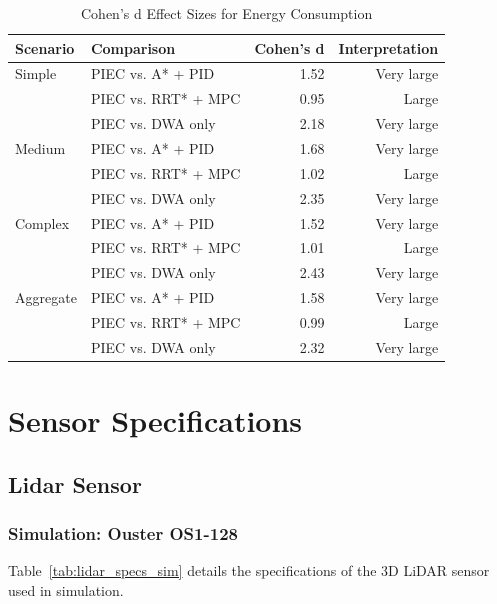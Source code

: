\begin{table}[htbp]
\centering
\caption{Cohen's d Effect Sizes for Energy Consumption}
\label{tab:effect_sizes}
\begin{tabular}{@{}llrr@{}}
\toprule
\textbf{Scenario} & \textbf{Comparison} & \textbf{Cohen's d} & \textbf{Interpretation} \\
\midrule
Simple & PIEC vs. A* + PID & 1.52 & Very large \\
& PIEC vs. RRT* + MPC & 0.95 & Large \\
& PIEC vs. DWA only & 2.18 & Very large \\
\midrule
Medium & PIEC vs. A* + PID & 1.68 & Very large \\
& PIEC vs. RRT* + MPC & 1.02 & Large \\
& PIEC vs. DWA only & 2.35 & Very large \\
\midrule
Complex & PIEC vs. A* + PID & 1.52 & Very large \\
& PIEC vs. RRT* + MPC & 1.01 & Large \\
& PIEC vs. DWA only & 2.43 & Very large \\
\midrule
Aggregate & PIEC vs. A* + PID & 1.58 & Very large \\
& PIEC vs. RRT* + MPC & 0.99 & Large \\
& PIEC vs. DWA only & 2.32 & Very large \\
\bottomrule
\end{tabular}
\end{table}

\clearpage

\section{Sensor Specifications}
\label{sec:sensor_specs}

\subsection{Lidar Sensor}

\subsubsection{Simulation: Ouster OS1-128}

Table~\ref{tab:lidar_specs_sim} details the specifications of the 3D LiDAR sensor used in simulation.

